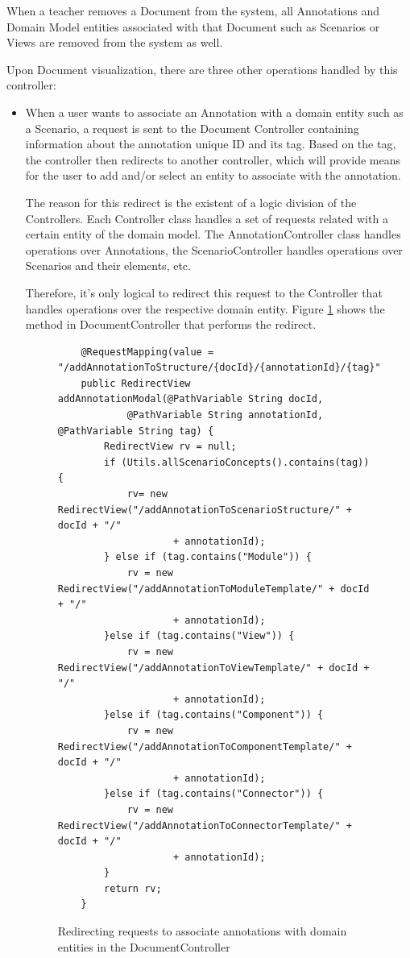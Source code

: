 When a teacher removes a Document from the system, all Annotations and Domain Model entities associated with that Document such as Scenarios or Views are removed from the system as well.

Upon Document visualization, there are three other operations handled by this controller:

\begin{itemize}
\item When a user wants to associate an Annotation with a domain entity such as a Scenario, a request is sent to the Document Controller containing information about the annotation unique ID and its tag. Based on the tag, the controller then redirects to another controller, which will provide means for the user to add and/or select an entity to associate with the annotation.

The reason for this redirect is the existent of a logic division of the Controllers. Each Controller class handles a set of requests related with a certain entity of the domain model. The AnnotationController class handles operations over Annotations, the ScenarioController handles operations over Scenarios and their elements, etc. 

Therefore, it's only logical to redirect this request to the Controller that handles operations over the respective domain entity. Figure \ref{figure:documentControllerLinkAnnotation} shows the method in DocumentController that performs the redirect.

\begin{figure}[h]
\lstset{style=customjava}
\begin{lstlisting}
	@RequestMapping(value = "/addAnnotationToStructure/{docId}/{annotationId}/{tag}")
	public RedirectView addAnnotationModal(@PathVariable String docId,
			@PathVariable String annotationId, @PathVariable String tag) {
		RedirectView rv = null;
		if (Utils.allScenarioConcepts().contains(tag)) {
			rv= new RedirectView("/addAnnotationToScenarioStructure/" + docId + "/"
					+ annotationId);
		} else if (tag.contains("Module")) {
			rv = new RedirectView("/addAnnotationToModuleTemplate/" + docId + "/"
					+ annotationId);
		}else if (tag.contains("View")) {
			rv = new RedirectView("/addAnnotationToViewTemplate/" + docId + "/"
					+ annotationId);
		}else if (tag.contains("Component")) {
			rv = new RedirectView("/addAnnotationToComponentTemplate/" + docId + "/"
					+ annotationId);
		}else if (tag.contains("Connector")) {
			rv = new RedirectView("/addAnnotationToConnectorTemplate/" + docId + "/"
					+ annotationId);
		}
		return rv;
	}	
\end{lstlisting}
\caption{Redirecting requests to associate annotations with domain entities in the DocumentController}
\label{figure:documentControllerLinkAnnotation}
\end{figure}


\end{itemize}
